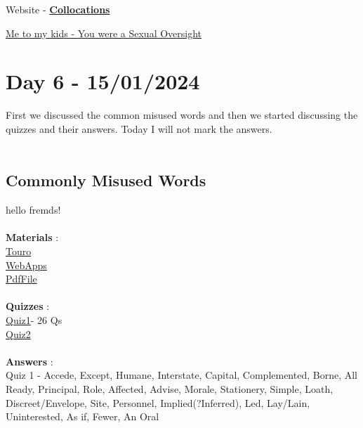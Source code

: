 \documentclass[a4paper,30pt]{report}
\begin{document}
      \par Website - \href{https://englishclub.com/ref/Collocations}{\textbf{Collocations}}\\
      \par \underline{Me to my kids - You were a Sexual Oversight}
  
  \chapter{Day 6 - 15/01/2024}
    First we discussed the common misused words and then we started discussing the quizzes and their answers. Today I will not mark the answers.\\\\ 
    \section{Commonly Misused Words}
     hello fremds! \\\\ 
      \textbf{Materials} :\\
        \href{https://www.touro.edu/departments/writing-center/tutorials/commonly-misused-words/?authuser=1}{Touro}\\
        \href{https://webapps.towson.edu/ows/exercises/posttest2.aspx?authuser=1}{WebApps}\\
        \href{https://drive.google.com/file/d/1-yyI_RZh5uIYTxD-jouX7BSp531Qydqm/view?usp=sharing}{PdfFile}\\\\
      \textbf{Quizzes} : \\
        \href{https://www.niu.edu/writingtutorial/grammar/quizzes/ConfusedWords.htm?authuser=1}{Quiz1}- 26 Qs\\
        \href{https://public.wsu.edu/~campbelld/amlit/quiz/usage.htm?authuser=1}{Quiz2}\\\\
      \textbf{Answers} : \\
        Quiz 1 - Accede, Except, Humane, Interstate, Capital, Complemented, Borne, All Ready, Principal, Role, Affected, Advise, Morale, Stationery, Simple, Loath, Discreet/Envelope, Site, Personnel, Implied(?Inferred), Led, Lay/Lain, Uninterested, As if, Fewer, An Oral\\\\
\end{document}

